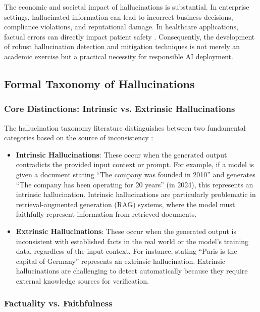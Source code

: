 The economic and societal impact of hallucinations is substantial. In enterprise settings, hallucinated information can lead to incorrect business decisions, compliance violations, and reputational damage. In healthcare applications, factual errors can directly impact patient safety \citep{nature2025medical}. Consequently, the development of robust hallucination detection and mitigation techniques is not merely an academic exercise but a practical necessity for responsible AI deployment.

\subsection{Formal Taxonomy of Hallucinations}

\subsubsection{Core Distinctions: Intrinsic vs. Extrinsic Hallucinations}

The hallucination taxonomy literature distinguishes between two fundamental categories based on the source of inconsistency \citep{huang2023survey,arxiv2025comprehensive}:

\begin{itemize}
    \item \textbf{Intrinsic Hallucinations}: These occur when the generated output contradicts the provided input context or prompt. For example, if a model is given a document stating ``The company was founded in 2010'' and generates ``The company has been operating for 20 years'' (in 2024), this represents an intrinsic hallucination. Intrinsic hallucinations are particularly problematic in retrieval-augmented generation (RAG) systems, where the model must faithfully represent information from retrieved documents.
    
    \item \textbf{Extrinsic Hallucinations}: These occur when the generated output is inconsistent with established facts in the real world or the model's training data, regardless of the input context. For instance, stating ``Paris is the capital of Germany'' represents an extrinsic hallucination. Extrinsic hallucinations are challenging to detect automatically because they require external knowledge sources for verification.
\end{itemize}

\subsubsection{Factuality vs. Faithfulness}

